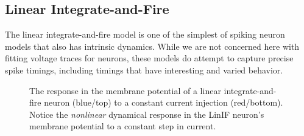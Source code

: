 \subsection{Linear Integrate-and-Fire}

The linear integrate-and-fire model is one of the simplest of spiking neuron models that also has intrinsic dynamics. While we are not concerned here with fitting voltage traces for neurons, these models do attempt to capture precise spike timings, including timings that have interesting and varied behavior.

\begin{figure}[h]
\centering
{}
\caption[Simbrain screenshot by Zo\"e Tosi]{The response in the membrane potential of a linear integrate-and-fire neuron (blue/top) to a constant current injection (red/bottom). Notice the \emph{nonlinear} dynamical response in the LinIF neuron's membrane potential to a constant step in current. }
\label{LinIF_Traces}
\end{figure}



